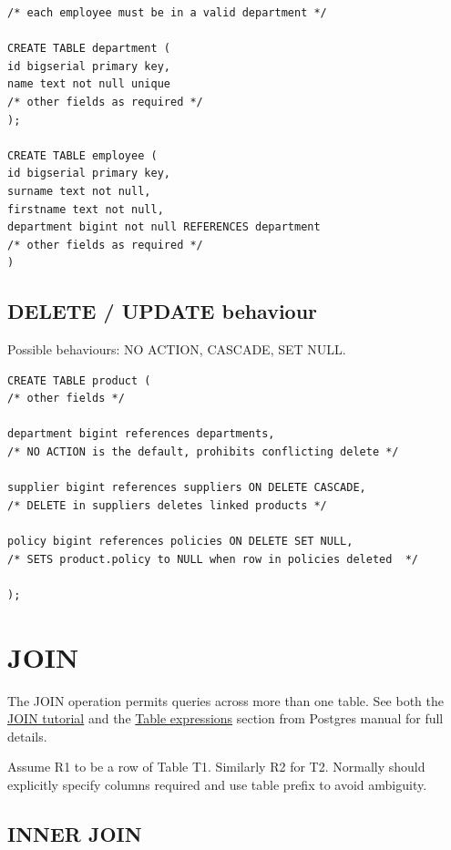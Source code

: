 \documentclass{pgnotes}
\begin{document}
\begin{verbatim}
/* each employee must be in a valid department */

CREATE TABLE department (
id bigserial primary key,
name text not null unique
/* other fields as required */
);

CREATE TABLE employee (
id bigserial primary key,
surname text not null,
firstname text not null,
department bigint not null REFERENCES department
/* other fields as required */
)
\end{verbatim}

\subsection{DELETE / UPDATE behaviour}\label{delete-update-behaviour}

Possible behaviours: NO ACTION, CASCADE, SET NULL.

\begin{verbatim}
CREATE TABLE product ( 
/* other fields */

department bigint references departments, 
/* NO ACTION is the default, prohibits conflicting delete */

supplier bigint references suppliers ON DELETE CASCADE,
/* DELETE in suppliers deletes linked products */

policy bigint references policies ON DELETE SET NULL,
/* SETS product.policy to NULL when row in policies deleted  */

);
\end{verbatim}

\section{JOIN}\label{join}

The JOIN operation permits queries across more than one table. See both
the
\href{https://www.postgresql.org/docs/current/tutorial-join.html}{JOIN
tutorial} and the
\href{https://www.postgresql.org/docs/13/queries-table-expressions.html}{Table
expressions} section from Postgres manual for full details.

Assume R1 to be a row of Table T1. Similarly R2 for T2. Normally should
explicitly specify columns required and use table prefix to avoid
ambiguity.

\subsection{INNER JOIN}\label{inner-join}
\end{document}
